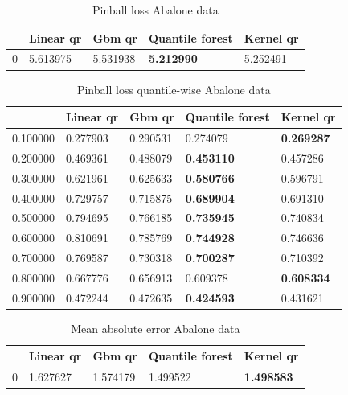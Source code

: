 \begin{table}
    \caption{Pinball loss Abalone data}
\begin{tabular}{lllll}
    \toprule
     & Linear qr & Gbm qr & Quantile forest & Kernel qr \\
    \midrule
    0 & 5.613975 & 5.531938 & \textbf{5.212990} & 5.252491 \\
    \bottomrule
    \end{tabular}
\end{table}
    
\begin{table}
    \caption{Pinball loss quantile-wise Abalone data}
    \begin{tabular}{lllll}
    \toprule
     & Linear qr & Gbm qr & Quantile forest & Kernel qr \\
    \midrule
    0.100000 & 0.277903 & 0.290531 & 0.274079 & \textbf{0.269287} \\
    0.200000 & 0.469361 & 0.488079 & \textbf{0.453110} & 0.457286 \\
    0.300000 & 0.621961 & 0.625633 & \textbf{0.580766} & 0.596791 \\
    0.400000 & 0.729757 & 0.715875 & \textbf{0.689904} & 0.691310 \\
    0.500000 & 0.794695 & 0.766185 & \textbf{0.735945} & 0.740834 \\
    0.600000 & 0.810691 & 0.785769 & \textbf{0.744928} & 0.746636 \\
    0.700000 & 0.769587 & 0.730318 & \textbf{0.700287} & 0.710392 \\
    0.800000 & 0.667776 & 0.656913 & 0.609378 & \textbf{0.608334} \\
    0.900000 & 0.472244 & 0.472635 & \textbf{0.424593} & 0.431621 \\
    \bottomrule
    \end{tabular}
\end{table}
    
\begin{table}
    \caption{Mean absolute error Abalone data}
    \begin{tabular}{lllll}
    \toprule
     & Linear qr & Gbm qr & Quantile forest & Kernel qr \\
    \midrule
    0 & 1.627627 & 1.574179 & 1.499522 & \textbf{1.498583} \\
    \bottomrule
    \end{tabular}
\end{table} 

